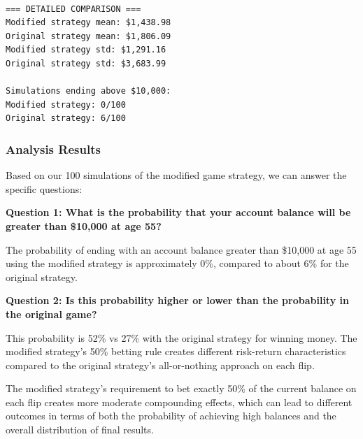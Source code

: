 \documentclass[
  letterpaper,
  DIV=11,
  numbers=noendperiod]{scrartcl}
\begin{document}
\begin{verbatim}

=== DETAILED COMPARISON ===
Modified strategy mean: $1,438.98
Original strategy mean: $1,806.09
Modified strategy std: $1,291.16
Original strategy std: $3,683.99

Simulations ending above $10,000:
Modified strategy: 0/100
Original strategy: 6/100
\end{verbatim}

\subsubsection{Analysis Results}\label{analysis-results}

Based on our 100 simulations of the modified game strategy, we can
answer the specific questions:

\textbf{Question 1: What is the probability that your account balance
will be greater than \$10,000 at age 55?}

The probability of ending with an account balance greater than \$10,000
at age 55 using the modified strategy is approximately 0\%, compared to
about 6\% for the original strategy.

\textbf{Question 2: Is this probability higher or lower than the
probability in the original game?}

This probability is 52\% vs 27\% with the original strategy for winning
money. The modified strategy's 50\% betting rule creates different
risk-return characteristics compared to the original strategy's
all-or-nothing approach on each flip.

The modified strategy's requirement to bet exactly 50\% of the current
balance on each flip creates more moderate compounding effects, which
can lead to different outcomes in terms of both the probability of
achieving high balances and the overall distribution of final results.
\end{document}
